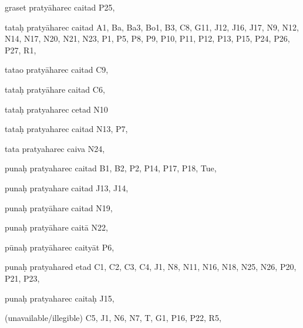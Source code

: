 \begin{marma}[hp02_009]
\begin{marma}[hp02_011]
 \begin{marma}[hp02_24c]
\item[graset pratyāharec caitad] P25, 
\item[tataḥ pratyāharec caitad] A1, Ba, Ba3, Bo1, B3, C8, G11, J12, J16, J17, N9, N12, N14, N17, N20, N21, N23, P1, P5, P8, P9, P10, P11, P12, P13, P15, P24, P26, P27, R1,
\item[tatao pratyāharec caitad] C9,
\item[tataḥ pratyāhare caitad] C6,
\item[tataḥ pratyaharec cetad] N10
\item[tataḥ pratyaharec caitad] N13, P7, 
\item[tata pratyaharec caiva] N24,
\item[punaḥ pratyaharec caitad] B1, B2, P2, P14, P17, P18, Tue,
\item[punaḥ pratyahare caitad] J13, J14, 
\item[punaḥ pratyāhare caitad] N19, 
\item[punaḥ pratyāhare caitā] N22,
\item[pūnaḥ pratyāharec caityāt] P6,
\item[punaḥ pratyahared etad] C1, C2, C3, C4, J1, N8, N11, N16, N18, N25, N26, P20, P21, P23, 
\item[punaḥ pratyaharec caitaḥ] J15,
\item[(unavailable/illegible)] C5, J1, N6, N7, T, G1, P16, P22, R5,
  \begin{description}

    \end{description}
 \end{marma}


\end{marma}
\end{marma}
